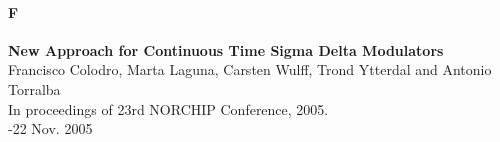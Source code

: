 \paragraph{F}\textbf{New Approach for Continuous Time Sigma Delta Modulators}\\
\indent Francisco Colodro, Marta Laguna, Carsten Wulff, Trond Ytterdal and
\indent Antonio Torralba\\
\indent In proceedings of 23rd NORCHIP Conference, 2005.\\
-22 Nov. 2005 

